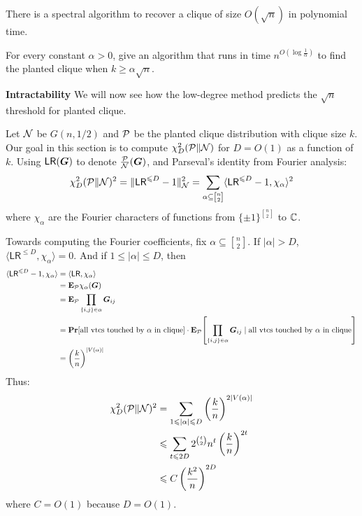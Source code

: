 \documentclass[11pt, letterpaper]{article}
\newcommand{\Null}{\calN}
\newcommand{\Planted}{\calP}
\newcommand{\LR}{\textsf{LR}}
\begin{document}
There is a spectral algorithm to recover a clique of size $O(\sqrt{n})$ in polynomial time.
\begin{tcolorbox}[arc=3mm,colback=White,coltext=Black,boxrule=1pt]
    \begin{exercise}
        For every constant $\alpha > 0$, give an algorithm that runs in time $n^{O(\log\frac1\alpha)}$ to find the planted clique when $k\ge\alpha\sqrt{n}$.
    \end{exercise}
\end{tcolorbox}

{\bf Intractability}
We will now see how the low-degree method predicts the $\sqrt{n}$ threshold for planted clique.

Let $\Null$ be $G(n,1/2)$ and $\Planted$ be the planted clique distribution with clique size $k$.
Our goal in this section is to compute $\chi^2_D(\Planted\|\Null)$ for $D = O(1)$ as a function of $k$.
Using $\LR(\bG)$ to denote $\frac{\Planted}{\Null}(\bG)$, and Parseval's identity from Fourier analysis:
\[
    \chi^2_D(\Planted\|\Null)^2 = \|\LR^{\le D} - 1\|_\Null^2 = \sum_{\alpha\subseteq {n\brack 2}} \langle \LR^{\le D} - 1, \chi_{\alpha} \rangle^2
\]
where $\chi_\alpha$ are the Fourier characters of functions from $\{\pm 1\}^{n\brack 2}$ to $\mathbb C$.

Towards computing the Fourier coefficients, fix $\alpha\subseteq{n\brack 2}$.
If $|\alpha|>D$, $\langle \LR^{\le D}, \chi_\alpha\rangle = 0$. And if $1\le|\alpha|\le D$, then
\begin{align*}
    \langle \LR^{\le D} - 1, \chi_\alpha\rangle
    &= \langle \LR, \chi_{\alpha}\rangle\\
    &= \E_{\Planted} \chi_{\alpha}(\bG)\\
    &= \E_{\Planted} \prod_{\{i,j\}\in\alpha} \bG_{ij}\\
    &= \Pr[\text{all vtcs touched by $\alpha$ in clique}]\cdot\E_{\Planted} \bracks*{\prod_{\{i,j\}\in\alpha} \bG_{ij}\mid\text{all vtcs touched by $\alpha$ in clique}} \\
    &= \left(\frac{k}{n}\right)^{|V(\alpha)|}
\end{align*}
Thus:
\begin{align*}
    \chi^2_D(\Planted\|\Null)^2 &= \sum_{1\le |\alpha|\le D}\left(\frac{k}{n}\right)^{2|V(\alpha)|} \\
    &\le \sum_{t\le 2D} 2^{t\choose 2} n^t \left(\frac{k}{n}\right)^{2t}\\
    &\le C\left(\frac{k^2}{n}\right)^{2D}
\end{align*}
where $C = O(1)$ because $D = O(1)$.
\end{document}
